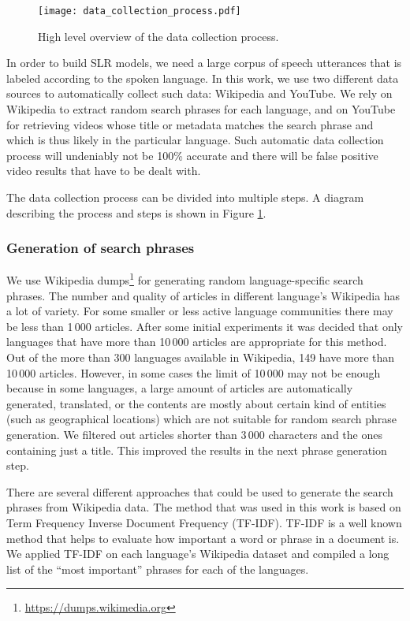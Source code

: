 \documentclass{article}
\begin{document}
\begin{figure}[t]
  \centering
  \texttt{[image: data\_collection\_process.pdf]}
  \caption{High level overview of the data collection process.}
  \label{fig:process}
\end{figure}


In order to build SLR models, we need a large corpus of speech utterances that is labeled according to the spoken language. In this work, we use  two different
data sources to automatically collect such data: Wikipedia and YouTube. We rely on Wikipedia to extract
random search phrases for each language, and on YouTube for retrieving videos whose title or metadata matches 
the search phrase and which is thus likely in the particular language. 
Such automatic data collection
process will undeniably not be 100\% accurate and there will be false positive video results
that have to be dealt with.


The data collection process can be divided into multiple steps. A diagram describing the process and steps is shown in Figure \ref{fig:process}. 

\subsubsection{Generation of search phrases}

We use Wikipedia dumps\footnote{\url{https://dumps.wikimedia.org}} for generating random language-specific search phrases. 
The number and quality of articles in different language's Wikipedia has a lot of variety.
For some smaller or less active language communities there may be less than 1\,000 articles. 
After some initial experiments it was decided that only languages that have more than 10\,000 articles are appropriate for this method.
Out of the more than 300 languages available in Wikipedia, 149 have more than 10\,000
articles. However, in some cases the limit of 10\,000 may not be enough because in some languages,
a large amount of articles are automatically generated, translated, or the contents are mostly
about certain kind of entities (such as geographical locations) which are not suitable for random search phrase generation.
We filtered out articles shorter than 3\,000 characters and the ones containing just a title. This improved the results in the next phrase
generation step. 

There are several different approaches that could be used to generate the search phrases from Wikipedia data.
The method that was used in this work is based on Term
Frequency Inverse Document Frequency (TF-IDF). TF-IDF is a well known method that
helps to evaluate how important a word or phrase in a document is. 
We applied TF-IDF on each language's Wikipedia dataset and compiled  a long list
of the ``most important'' phrases for each of the languages.
\end{document}
